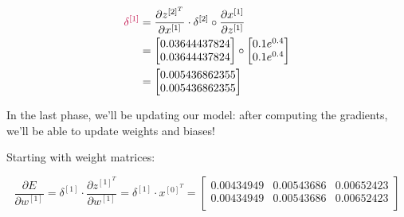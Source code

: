 \documentclass[12pt]{article}
\begin{document}
\begin{enumerate}[leftmargin=\labelsep]
\begin{multicols}{2}
          \begin{equation*}
            \begin{aligned}
              \textcolor{purple}{\delta^{[1]}} & = \frac{\partial z^{[2]^T}}{\partial x^{[1]}} \cdot \delta^{[2]} \circ \frac{\partial x^{[1]}}{\partial z^{[1]}} \\
                                               & = \begin{bmatrix}
                                                     0.03644437824 \\
                                                     0.03644437824
                                                   \end{bmatrix} \circ \begin{bmatrix}
                                                                         0.1 e^{0.4} \\
                                                                         0.1 e^{0.4}
                                                                       \end{bmatrix}                                                                             \\
                                               & = \begin{bmatrix}
                                                     0.005436862355 \\
                                                     0.005436862355
                                                   \end{bmatrix}
            \end{aligned}
          \end{equation*}

        \end{multicols}

        In the last phase, we'll be updating our model: after computing the gradients,
        we'll be able to update weights and biases!

        Starting with weight matrices:

        \begin{equation*}
          \frac{\partial E}{\partial w^{[1]}} = \delta^{[1]} \cdot
          \frac{\partial z^{[1]^T}}{\partial w^{[1]}}
          = \delta^{[1]} \cdot x^{[0]^T}
          = \begin{bmatrix}
            0.00434949 & 0.00543686 & 0.00652423 \\
            0.00434949 & 0.00543686 & 0.00652423 \\
          \end{bmatrix}
        \end{equation*}


\end{enumerate}
\end{document}
